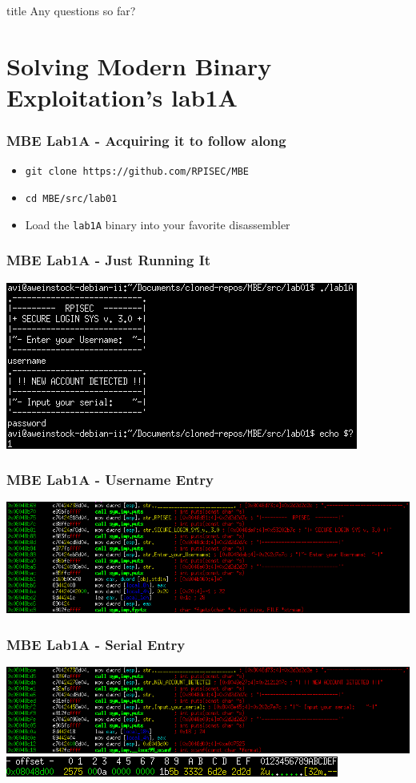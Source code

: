 \documentclass[aspectratio=169]{beamer}
\newcommand{\questionsslide}[1]{
  \begin{frame}
  \vfill
  \centering
  \begin{beamercolorbox}[sep=8pt,center,shadow=true,rounded=true]{title}
    \usebeamerfont{title}Any questions#1?\par%
  \end{beamercolorbox}
  \vfill
  \end{frame}
}
\begin{document}
\questionsslide{ so far}
\section{Solving Modern Binary Exploitation's lab1A}

\begin{frame}[fragile]
\frametitle{MBE Lab1A - Acquiring it to follow along}
\begin{itemize}
\item \verb|git clone https://github.com/RPISEC/MBE|
\item \verb|cd MBE/src/lab01|
\item Load the \verb|lab1A| binary into your favorite disassembler
\end{itemize}
\end{frame}

\begin{frame}[fragile]
\frametitle{MBE Lab1A - Just Running It}
\includegraphics[width=0.9\paperwidth]{pictures/mbe_lab1a_dynamic_fail_cropped.png}
\end{frame}

\begin{frame}[fragile]
\frametitle{MBE Lab1A - Username Entry}
\includegraphics[width=0.9\paperwidth]{pictures/intel/mbe_lab1a_username_entry.png}
\end{frame}

\begin{frame}[fragile]
\frametitle{MBE Lab1A - Serial Entry}
\includegraphics[width=0.9\paperwidth]{pictures/intel/mbe_lab1a_serial_entry.png}\\
\includegraphics[width=0.9\paperwidth]{pictures/mbe_lab1_scanf_arg_cropped.png}
\end{frame}
\end{document}
